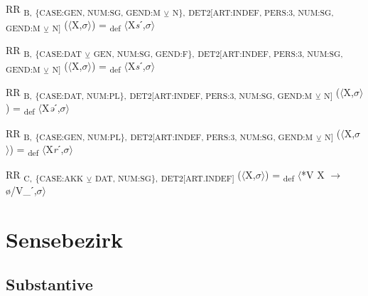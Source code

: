{\begin{exe}
 RR \textsubscript{B,} \textsubscript{\{CASE:GEN, NUM:SG, GEND:M} \textsubscript{${\veebar}$}\textsubscript{ N\},} \textsubscript{DET2[ART:INDEF, PERS:3, NUM:SG, GEND:M} \textsubscript{${\veebar}$}\textsubscript{ N]} ($\langle$X,$\sigma $$\rangle$) = \textsubscript{def} $\langle$X\textit{s}ˊ,$\sigma $$\rangle$
\end{exe}

\begin{exe}
 RR \textsubscript{B,} \textsubscript{\{CASE:DAT} \textsubscript{${\veebar}$}\textsubscript{ GEN, NUM:SG, GEND:F\},} \textsubscript{DET2[ART:INDEF, PERS:3, NUM:SG, GEND:M} \textsubscript{${\veebar}$}\textsubscript{ N]} ($\langle$X,$\sigma $$\rangle$) = \textsubscript{def} $\langle$X\textit{s}ˊ,$\sigma $$\rangle$
\end{exe}

\begin{exe}
 RR \textsubscript{B,} \textsubscript{\{CASE:DAT, NUM:PL\},} \textsubscript{DET2[ART:INDEF, PERS:3, NUM:SG, GEND:M} \textsubscript{${\veebar}$}\textsubscript{ N]} ($\langle$X,$\sigma $$\rangle$) = \textsubscript{def} $\langle$X\textit{ə}ˊ,$\sigma $$\rangle$
\end{exe}

\begin{exe}
 RR \textsubscript{B,} \textsubscript{\{CASE:GEN, NUM:PL\},} \textsubscript{DET2[ART:INDEF, PERS:3, NUM:SG, GEND:M} \textsubscript{${\veebar}$}\textsubscript{ N]} ($\langle$X,$\sigma $$\rangle$) = \textsubscript{def} $\langle$X\textit{r}ˊ,$\sigma $$\rangle$
\end{exe}

\begin{exe}
 RR \textsubscript{C,} \textsubscript{\{CASE:AKK} \textsubscript{${\veebar}$}\textsubscript{ DAT, NUM:SG\},} \textsubscript{DET2[ART.INDEF]} ($\langle$X,$\sigma $$\rangle$) = \textsubscript{def} $\langle$*V X $\rightarrow$ ø/V\_ˊ,$\sigma $$\rangle$
\end{exe}

\section{Sensebezirk}

\subsection{Substantive}

}
